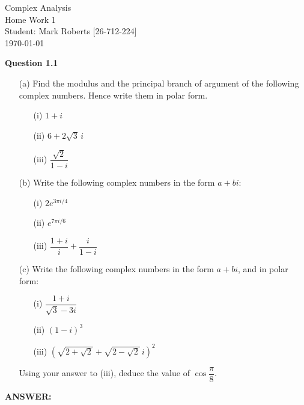 \documentclass[12pt,a4paper]{article}
\newcommand{\answer}{\vspace{3\baselineskip}\textbf{ANSWER:}}
\newcommand{\question}[2]{\textbf{Question #1}\quad #2}
\begin{document}
\begin{titlepage}
\centering
\vspace*{\fill} %

{\Huge Complex Analysis} \\[0.5cm] %
{\Huge Home Work 1}\\[1.5cm] %
{\Large Student: Mark Roberts [26-712-224]}\\[0.5cm] %
{\Large \today} %

\vspace*{\fill}
\end{titlepage}
\newpage

\question{1.1}{
\begin{enumerate}
\item[(a)] Find the modulus and the principal branch of argument of the following complex numbers. Hence write them in polar form.

\begin{enumerate}
\item[(i)] $1+i$
\item[(ii)] $6+2\sqrt{3}\,i$
\item[(iii)] $\dfrac{\sqrt{2}}{1-i}$
\end{enumerate}

\item[(b)] Write the following complex numbers in the form $a+bi$:
\begin{enumerate}
\item[(i)] $2e^{3\pi i/4}$
\item[(ii)] $e^{7\pi i/6}$
\item[(iii)] $\dfrac{1+i}{i}+\dfrac{i}{1-i}$
\end{enumerate}

\item[(c)] Write the following complex numbers in the form $a+bi$, and in polar form:
\begin{enumerate}
\item[(i)] $\dfrac{1+i}{\sqrt{3}-3i}$
\item[(ii)] $(1-i)^3$
\item[(iii)] $\left(\sqrt{2+\sqrt{2}}+\sqrt{2-\sqrt{2}}\,i\right)^2$
\end{enumerate}

Using your answer to (iii), deduce the value of $\cos\dfrac{\pi}{8}$.
\end{enumerate}
}

\answer
\end{document}
